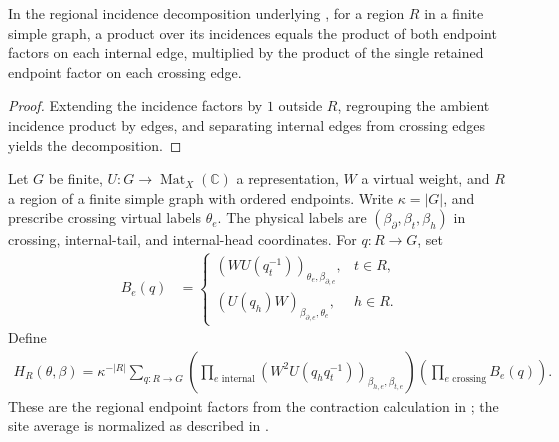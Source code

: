 \begin{lemma}%
    \label{thm:peps_graph_open_incidence_product}
    \leanok
    In the regional incidence decomposition underlying
    \cite[Sections~6.2 and~7]{Schuch2010PEPS}, for a region $R$ in a finite
    simple graph, a product over its incidences
    equals the product of both endpoint factors on each internal edge,
    multiplied by the product of the single retained endpoint factor on each
    crossing edge.
\end{lemma}

\begin{proof}\leanok
    Extending the incidence factors by $1$ outside $R$, regrouping the ambient
    incidence product by edges, and separating internal edges from crossing
    edges yields the decomposition.
\end{proof}

\begin{definition}%
    \label{def:peps_graph_open_averaging_bond_state}
    \leanok
    Let $G$ be finite, $U:G\to\operatorname{Mat}_X(\mathbb C)$ a
    representation, $W$ a virtual weight, and $R$ a region of a finite simple
    graph with ordered endpoints. Write $\kappa=|G|$, and prescribe crossing
    virtual labels $\theta_e$. The physical labels are
    $(\beta_{\partial},\beta_t,\beta_h)$ in crossing, internal-tail, and
    internal-head coordinates. For $q:R\to G$, set
    \begin{align}
        B_e(q) & =
        \begin{cases}
            (WU(q_t^{-1}))_{\theta_e,\beta_{\partial,e}}, & t\in R, \\
            (U(q_h)W)_{\beta_{\partial,e},\theta_e},      & h\in R.
        \end{cases}
    \end{align}
    Define
    \begin{align}
        H_R(\theta,\beta)
        =\kappa^{-|R|}\sum_{q:R\to G}
        \left(\prod_{e\text{ internal}}
        (W^2U(q_hq_t^{-1}))_{\beta_{h,e},\beta_{t,e}}\right)
        \left(\prod_{e\text{ crossing}}B_e(q)\right).
    \end{align}
    These are the regional endpoint factors from the contraction calculation
    in \cite[Sections~6.2 and~7]{Schuch2010PEPS}; the site average is normalized
    as described in \cite{gap:rmp_peps_quantum_double_g_isometry}.
\end{definition}


